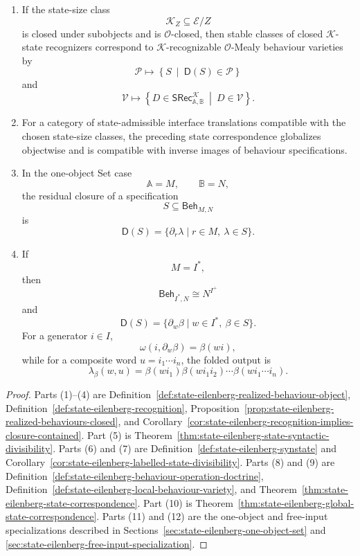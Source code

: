 \begin{theorem}
\begin{enumerate}
\item If the state-size class
\[
\mathcal K_Z\subseteq\mathcal E/Z
\]
is closed under subobjects and is \(\mathcal O\)-closed, then stable classes
of closed \(\mathcal K\)-state recognizers correspond to
\(\mathcal K\)-recognizable \(\mathcal O\)-Mealy behaviour varieties by
\[
\mathcal P
\longmapsto
\left\{
S
\ \middle|\
\mathsf D(S)\in\mathcal P
\right\}
\]
and
\[
\mathcal V
\longmapsto
\left\{
D\in\mathsf{SRec}^{\mathcal K}_{\mathbb A,\mathbb B}
\ \middle|\
D\in\mathcal V
\right\}.
\]

\item For a category of state-admissible interface translations compatible
with the chosen state-size classes, the preceding state correspondence
globalizes objectwise and is compatible with inverse images of behaviour
specifications.

\item In the one-object Set case
\[
\mathbb A=M,
\qquad
\mathbb B=N,
\]
the residual closure of a specification
\[
S\subseteq\mathsf{Beh}_{M,N}
\]
is
\[
\mathsf D(S)
=
\{\partial_r\lambda\mid r\in M,\ \lambda\in S\}.
\]

\item If
\[
M=I^\ast,
\]
then
\[
\mathsf{Beh}_{I^\ast,N}\cong N^{I^+}
\]
and
\[
\mathsf D(S)
=
\{\partial_w\beta\mid w\in I^\ast,\ \beta\in S\}.
\]
For a generator \(i\in I\),
\[
\omega(i,\partial_w\beta)=\beta(wi),
\]
while for a composite word \(u=i_1\cdots i_n\), the folded output is
\[
\lambda_\beta(w,u)
=
\beta(wi_1)\beta(wi_1i_2)\cdots
\beta(wi_1\cdots i_n).
\]
\end{enumerate}
\end{theorem}

\begin{proof}
Parts (1)--(4) are
Definition~\ref{def:state-eilenberg-realized-behaviour-object},
Definition~\ref{def:state-eilenberg-recognition},
Proposition~\ref{prop:state-eilenberg-realized-behaviours-closed}, and
Corollary~\ref{cor:state-eilenberg-recognition-implies-closure-contained}.
Part (5) is
Theorem~\ref{thm:state-eilenberg-state-syntactic-divisibility}.
Parts (6) and (7) are
Definition~\ref{def:state-eilenberg-synstate} and
Corollary~\ref{cor:state-eilenberg-labelled-state-divisibility}.
Parts (8) and (9) are
Definition~\ref{def:state-eilenberg-behaviour-operation-doctrine},
Definition~\ref{def:state-eilenberg-local-behaviour-variety}, and
Theorem~\ref{thm:state-eilenberg-state-correspondence}.
Part (10) is
Theorem~\ref{thm:state-eilenberg-global-state-correspondence}.
Parts (11) and (12) are the one-object and free-input specializations
described in Sections~\ref{sec:state-eilenberg-one-object-set} and
\ref{sec:state-eilenberg-free-input-specialization}.
\end{proof}

